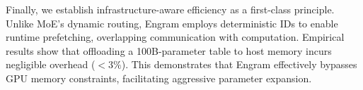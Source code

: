 Finally, we establish infrastructure-aware efficiency as a first-class principle. Unlike MoE's dynamic routing, Engram employs deterministic IDs to enable runtime prefetching, overlapping communication with computation. Empirical results show that offloading a 100B-parameter table to host memory incurs negligible overhead ($<3\%$). This demonstrates that Engram effectively bypasses GPU memory constraints, facilitating aggressive parameter expansion.